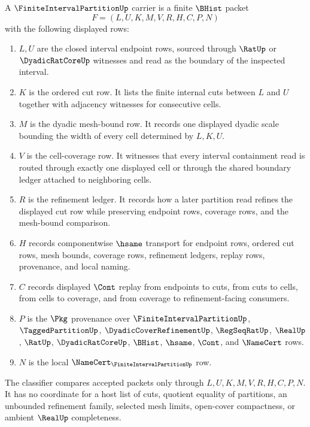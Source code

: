 \begin{definition}
\label{def:finite-interval-partition-carrier}
A $\FiniteIntervalPartitionUp$ carrier is a finite $\BHist$ packet
$$
F=(L,U,K,M,V,R,H,C,P,N)
$$
with the following displayed rows:
\begin{enumerate}
\item $L,U$ are the closed interval endpoint rows, sourced through $\RatUp$ or $\DyadicRatCoreUp$ witnesses and read as the boundary of the inspected interval.
\item $K$ is the ordered cut row. It lists the finite internal cuts between $L$ and $U$ together with adjacency witnesses for consecutive cells.
\item $M$ is the dyadic mesh-bound row. It records one displayed dyadic scale bounding the width of every cell determined by $L,K,U$.
\item $V$ is the cell-coverage row. It witnesses that every interval containment read is routed through exactly one displayed cell or through the shared boundary ledger attached to neighboring cells.
\item $R$ is the refinement ledger. It records how a later partition read refines the displayed cut row while preserving endpoint rows, coverage rows, and the mesh-bound comparison.
\item $H$ records componentwise $\hsame$ transport for endpoint rows, ordered cut rows, mesh bounds, coverage rows, refinement ledgers, replay rows, provenance, and local naming.
\item $C$ records displayed $\Cont$ replay from endpoints to cuts, from cuts to cells, from cells to coverage, and from coverage to refinement-facing consumers.
\item $P$ is the $\Pkg$ provenance over $\FiniteIntervalPartitionUp$, $\TaggedPartitionUp$, $\DyadicCoverRefinementUp$, $\RegSeqRatUp$, $\RealUp$, $\RatUp$, $\DyadicRatCoreUp$, $\BHist$, $\hsame$, $\Cont$, and $\NameCert$ rows.
\item $N$ is the local $\NameCert_{\FiniteIntervalPartitionUp}$ row.
\end{enumerate}
The classifier compares accepted packets only through $L,U,K,M,V,R,H,C,P,N$. It has no coordinate for a host list of cuts, quotient equality of partitions, an unbounded refinement family, selected mesh limits, open-cover compactness, or ambient $\RealUp$ completeness.
\end{definition}

